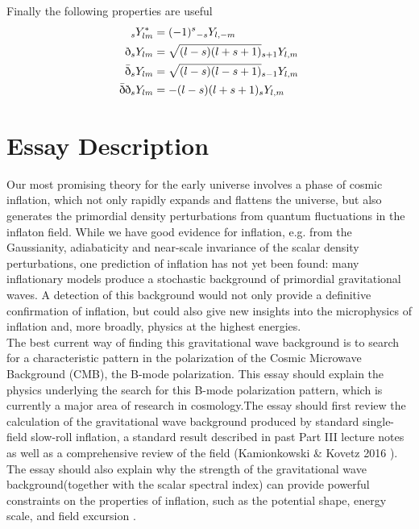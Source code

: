 \documentclass[a4paper,10pt]{article}
\newcommand{\sr}{\text{\normalfont\dh}}
\renewcommand{\sl}{\bar{\text{\normalfont\dh}}}
\begin{document}
Finally the following properties are useful
\begin{equation}\begin{split}
{}_sY_{lm}^* &= (-1)^s {}_{-s}Y_{l,-m}\\
\sr {}_sY_{lm} &= \sqrt{(l-s)(l+s+1)}{}_{s+1}Y_{l,m}\\
\sl {}_sY_{lm} &= \sqrt{(l-s)(l-s+1)}{}_{s-1}Y_{l,m}\\
\sl\sr {}_sY_{lm} &= -(l-s)(l+s+1){}_{s}Y_{l,m}
\label{propertiesofspin}
\end{split}\end{equation}

\section{Essay Description}
Our most promising theory for the early universe involves a phase of cosmic inflation, which not only rapidly expands and flattens the universe, but also generates the primordial density perturbations from quantum fluctuations in the inflaton field. While we have good evidence for inflation, e.g. from the Gaussianity, adiabaticity and near-scale invariance of the scalar density perturbations, one prediction of inflation has not yet been found: many inflationary models produce a stochastic background of primordial gravitational waves. A detection of this background would not only provide a definitive confirmation of inflation, but could also give new insights into the microphysics of inflation and, more broadly, physics at the highest energies.\\

The best current way of finding this gravitational wave background is to search for a characteristic pattern in the polarization of the Cosmic Microwave Background (CMB), the B-mode polarization. This essay should explain the physics underlying the search for this B-mode polarization pattern, which is currently a major area of research in cosmology.The essay should first review the calculation of the gravitational wave background produced by standard single-field slow-roll inflation, a standard result described in past Part III lecture notes as well as a comprehensive review of the field (Kamionkowski \& Kovetz 2016 \cite{QBM}). The essay should also explain why the strength of the gravitational wave background(together with the scalar spectral index) can provide powerful constraints on the properties of inflation, such as the potential shape, energy scale, and field excursion \cite{S4, QBM}.\\
\end{document}
